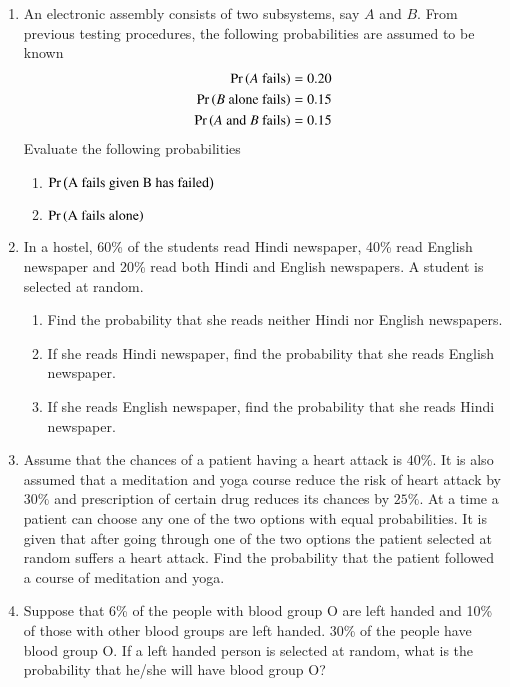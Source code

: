 \begin{enumerate}[label=\thesubsection.\arabic*,ref=\thesubsection.\theenumi]
	\item An electronic assembly consists of two subsystems, say $A$ and $B$. From previous testing procedures, the following probabilities are assumed to be known
\begin{align}
\Pr\left(A\text{ fails}\right)&=0.20
\\ \Pr\left(B\text{ alone fails}\right)&=0.15
	\\ \Pr\left(A\text{ and }B \text{ fails}\right)&=0.15
\end{align}
 Evaluate the following probabilities
 \begin{enumerate}
 \item $\Pr\left(\text{A fails given B has failed}\right)$
 \item $\Pr\left(\text{A fails alone}\right)$
\end{enumerate}
		\solution
		
  \item
  In a hostel, 60\% of the students read Hindi newspaper, 40\% read English
newspaper and 20\% read both Hindi and English newspapers. A student is
selected at random.
\begin{enumerate}
\item Find the probability that she reads neither Hindi nor English newspapers.
\item If she reads Hindi newspaper, find the probability that she reads English
newspaper.
\item If she reads English newspaper, find the probability that she reads Hindi
newspaper.
\end{enumerate}
\solution

	\item Assume that the chances of a patient having a heart attack is $40\%$. It is also assumed that a meditation and yoga course reduce the risk of heart attack by $30\%$ and prescription of certain drug reduces its chances by $25\%$. At a time a patient can choose any one of the two options with equal probabilities. It is given that after going through one of the two options the patient selected at random suffers a heart attack. Find the probability that the patient followed a course of meditation and yoga.
	\\
		\solution
		
\item Suppose that 6\% of the people with blood group O are left handed and 10\% of those with other blood groups are left handed. 30\% of the people have blood group O. If a left handed person is selected at random, what is the probability that he/she will have blood group O?

\end{enumerate}
